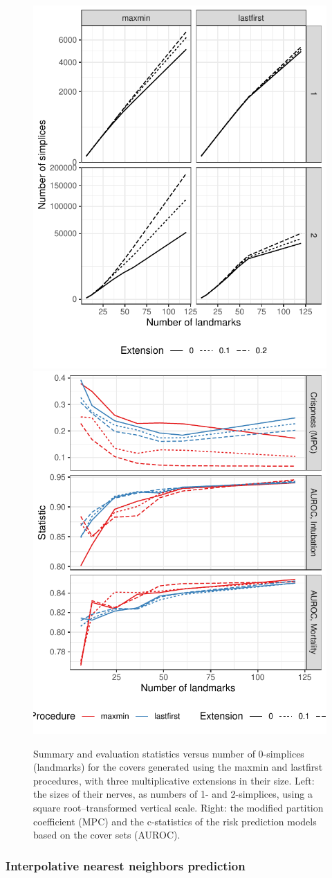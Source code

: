 \documentclass{article}
\begin{document}
\begin{figure}
\includegraphics[width=.5\textwidth]{cover-simplices-mx}
\includegraphics[width=.5\textwidth]{cover-evaluate-mx}
\caption{
Summary and evaluation statistics versus number of 0-simplices (landmarks) for the covers generated using the maxmin and lastfirst procedures, with three multiplicative extensions in their size.
Left: the sizes of their nerves, as numbers of 1- and 2-simplices, using a square root--transformed vertical scale.
Right: the modified partition coefficient (MPC) and the c-statistics of the risk prediction models based on the cover sets (AUROC).
\label{fig:cover-mx}
}
\end{figure}

\hypertarget{interpolative-nearest-neighbors-prediction-1}{%
\subsubsection{Interpolative nearest neighbors
prediction}\label{interpolative-nearest-neighbors-prediction-1}}
\end{document}
